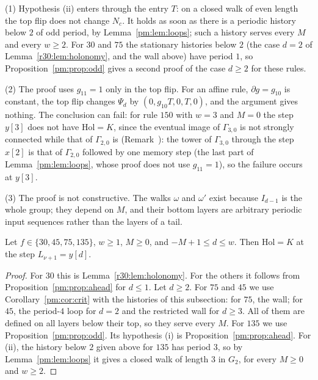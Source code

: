 \begin{remark}\label{pm:rem:odd}
(1) Hypothesis (ii) enters through the entry $T$: on a closed walk of even length the top flip does not change $N_c$. It holds as soon as there is a periodic history below $2$ of odd period, by Lemma~\ref{pm:lem:loops}; such a history serves every $M$ and every $w\ge2$. For $30$ and $75$ the stationary histories below $2$ (the case $d=2$ of Lemma~\ref{r30:lem:holonomy}, and the wall above) have period $1$, so Proposition~\ref{pm:prop:odd} gives a second proof of the case $d\ge2$ for these rules.

(2) The proof uses $g_{11}=1$ only in the top flip. For an affine rule, $\partial g=g_{10}$ is constant, the top flip changes $\Psi_d$ by $(0,g_{10}T,0,T,0)$, and the argument gives nothing. The conclusion can fail: for rule $150$ with $w=3$ and $M=0$ the step $y[3]$ does not have $\mathrm{Hol}=K$, since the eventual image of $\Gamma_{3,0}$ is not strongly connected while that of $\Gamma_{2,0}$ is (Remark~): the tower of $\Gamma_{3,0}$ through the step $x[2]$ is that of $\Gamma_{2,0}$ followed by one memory step (the last part of Lemma~\ref{pm:lem:loops}, whose proof does not use $g_{11}=1$), so the failure occurs at $y[3]$.

(3) The proof is not constructive. The walks $\omega$ and $\omega'$ exist because $I_{d-1}$ is the whole group; they depend on $M$, and their bottom layers are arbitrary periodic input sequences rather than the layers of a tail.
\end{remark}

\begin{proposition}\label{pm:prop:hol}
Let $f\in\{30,45,75,135\}$, $w\ge1$, $M\ge0$, and $-M+1\le d\le w$. Then $\mathrm{Hol}=K$ at the step $L_{\nu+1}=y[d]$.
\end{proposition}

\begin{proof}
For $30$ this is Lemma~\ref{r30:lem:holonomy}. For the others it follows from Proposition~\ref{pm:prop:ahead} for $d\le1$. Let $d\ge2$. For $75$ and $45$ we use Corollary~\ref{pm:cor:crit} with the histories of this subsection: for $75$, the wall; for $45$, the period-$4$ loop for $d=2$ and the restricted wall for $d\ge3$. All of them are defined on all layers below their top, so they serve every $M$. For $135$ we use Proposition~\ref{pm:prop:odd}. Its hypothesis (i) is Proposition~\ref{pm:prop:ahead}. For (ii), the history below $2$ given above for $135$ has period $3$, so by Lemma~\ref{pm:lem:loops} it gives a closed walk of length $3$ in $G_2$, for every $M\ge0$ and $w\ge2$.
\end{proof}


